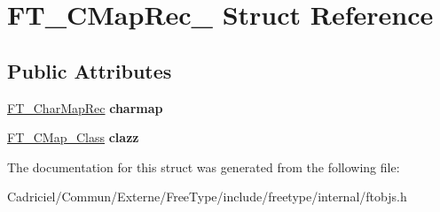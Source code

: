\hypertarget{struct_f_t___c_map_rec__}{\section{F\-T\-\_\-\-C\-Map\-Rec\-\_\- Struct Reference}
\label{struct_f_t___c_map_rec__}
}
\subsection*{Public Attributes}
\begin{DoxyCompactItemize}
\item 
\hypertarget{struct_f_t___c_map_rec___a39fa6de9995d4ae4496b93e2b874b34e}{\hyperlink{struct_f_t___char_map_rec__}{F\-T\-\_\-\-Char\-Map\-Rec} {\bfseries charmap}}\label{struct_f_t___c_map_rec___a39fa6de9995d4ae4496b93e2b874b34e}

\item 
\hypertarget{struct_f_t___c_map_rec___aa85db42650df0edb38f8af5887c0ac6a}{\hyperlink{struct_f_t___c_map___class_rec__}{F\-T\-\_\-\-C\-Map\-\_\-\-Class} {\bfseries clazz}}\label{struct_f_t___c_map_rec___aa85db42650df0edb38f8af5887c0ac6a}

\end{DoxyCompactItemize}


The documentation for this struct was generated from the following file\-:\begin{DoxyCompactItemize}
\item 
Cadriciel/\-Commun/\-Externe/\-Free\-Type/include/freetype/internal/ftobjs.\-h\end{DoxyCompactItemize}
